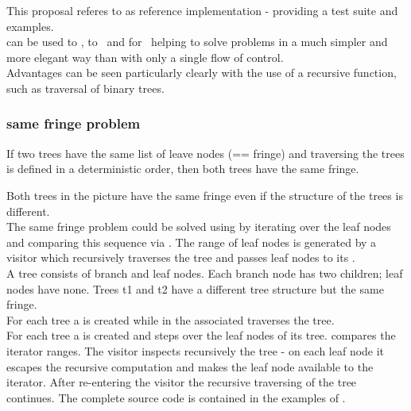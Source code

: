 
This proposal referes to \boostcoroutine as reference implementation - providing
a test suite and examples.\\
\newline
\coro can be used to \escrecloops, to \escreccomps~and for \coopmultitasking~helping
to solve problems in a much simpler and more elegant way than with only a single
flow of control.\\
Advantages can be seen particularly clearly with the use of a recursive function,
such as traversal of binary trees.

\subsubsection*{same fringe problem}

If two trees have the same list of leave nodes (== fringe) and traversing the
trees is defined in a deterministic order, then both trees have the same fringe.\\


Both trees in the picture have the same fringe even if the structure of the trees
is different.\\
\newline
The same fringe problem could be solved using \coro by iterating over the leaf
nodes and comparing this sequence via . The range of leaf
nodes is generated by a visitor which recursively traverses the tree and passes
leaf nodes to its \coro.\\
\newline
{}
A tree consists of branch and leaf nodes. Each branch node has two children; leaf
nodes have none. Trees t1 and t2 have a different tree structure but the same fringe.\\
For each tree a \coro is created while in the associated \corofunction {}
traverses the tree.\\
For each tree a \coro is created and \coroiterator steps over the leaf nodes of
its tree.  compares the iterator ranges.
\newline
{}
The visitor inspects recursively the tree - on each leaf node it escapes the recursive
computation and makes the leaf node available to the iterator. After re-entering the
visitor the recursive traversing of the tree continues.
\newline
The complete source code is contained in the examples of \boostcoroutine.

